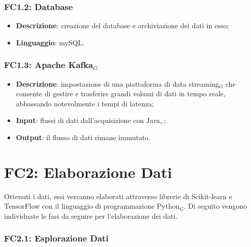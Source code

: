 \subsubsection{FC1.2: Database}\label{fasiProgettoAquisizioneDatiDatabase}

\begin{itemize}
	\item \textbf{Descrizione}: creazione del database e archiviazione dei dati in esso;
	\item \textbf{Linguaggio}: mySQL.
\end{itemize}

\subsubsection{FC1.3: Apache Kafka$_G$}\label{fasiProgettoAquisizioneDatiApacheKafka}

\begin{itemize}
	\item \textbf{Descrizione}: impostazione di una piattaforma di data streaming$_G$ che consente di gestire e trasferire grandi volumi di dati in tempo reale, abbassando notevolmente i tempi di latenza;
	\item \textbf{Input}: flussi di dati dall'acquisizione con Java$_{\scaleto{G}{3pt}}$;
		\item \textbf{Output}: il flusso di dati rimane immutato.
\end{itemize}


\section{FC2: Elaborazione Dati}\label{fasiProgettoElaborazioneDati}
Ottenuti i dati, essi verranno elaborati attraverso librerie di Scikit-learn e TensorFlow con il linguaggio di programmazione Python$_G$.
Di seguito vengono individuate le fasi da seguire per l'elaborazione dei dati.

\subsubsection{FC2.1: Esplorazione Dati}\label{fasiProgettoElaborazioneDatiEsplorazioneDati}

